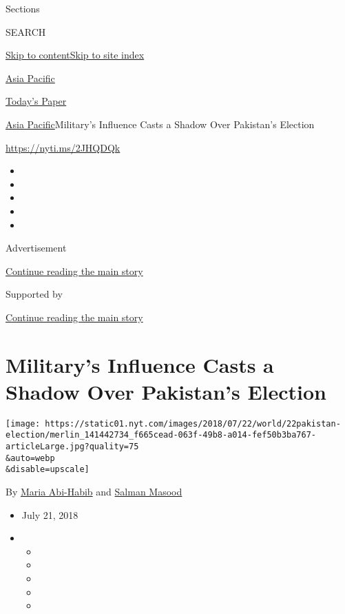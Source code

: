 Sections

SEARCH

\protect\hyperlink{site-content}{Skip to
content}\protect\hyperlink{site-index}{Skip to site index}

\href{https://www.nytimes.com/section/world/asia}{Asia Pacific}

\href{https://myaccount.nytimes.com/auth/login?response_type=cookie\&client_id=vi}{}

\href{https://www.nytimes.com/section/todayspaper}{Today's Paper}

\href{/section/world/asia}{Asia Pacific}\textbar{}Military's Influence
Casts a Shadow Over Pakistan's Election

\url{https://nyti.ms/2JHQDQk}

\begin{itemize}
\item
\item
\item
\item
\item
\end{itemize}

Advertisement

\protect\hyperlink{after-top}{Continue reading the main story}

Supported by

\protect\hyperlink{after-sponsor}{Continue reading the main story}

\hypertarget{militarys-influence-casts-a-shadow-over-pakistans-election}{%
\section{Military's Influence Casts a Shadow Over Pakistan's
Election}\label{militarys-influence-casts-a-shadow-over-pakistans-election}}

\texttt{[image: https://static01.nyt.com/images/2018/07/22/world/22pakistan-election/merlin\_141442734\_f665cead-063f-49b8-a014-fef50b3ba767-articleLarge.jpg?quality=75\\\&auto=webp\\\&disable=upscale]}

By \href{https://www.nytimes.com/by/maria-abi-habib}{Maria Abi-Habib}
and \href{https://www.nytimes.com/by/salman-masood}{Salman Masood}

\begin{itemize}
\item
  July 21, 2018
\item
  \begin{itemize}
  \item
  \item
  \item
  \item
  \item
  \end{itemize}
\end{itemize}

